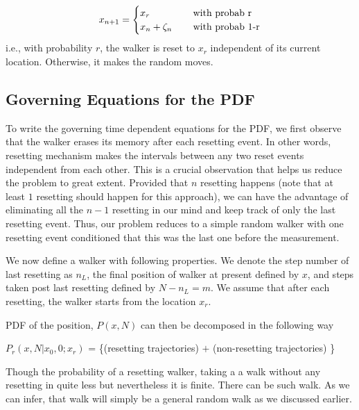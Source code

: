 \documentclass[showpacs,amsmath,amssymb,aps,pre,twocolumn]{revtex4-1}
\begin{document}
\begin{align}
x_{n+1} =\begin{cases}
          x_r \quad & \,  \textnormal{with probab r} \\
          x_n + \zeta _n \quad & \,  \textnormal{with probab 1-r}
     \end{cases}
\end{align}
i.e., with probability $r$, the walker is reset to $x_r$ independent of its current location. Otherwise, it makes the random moves.
\subsection{Governing Equations for the PDF}
To write the governing time dependent equations for the PDF, we first observe that the walker erases its memory after each resetting event. In other words, resetting mechanism makes the intervals between any two reset events independent from each other. This is a crucial observation that helps us reduce the problem to great extent. Provided that $n$ resetting happens (note that at least $1$ resetting should happen for this approach), we can have the advantage of eliminating all the $n-1$ resetting in our mind and keep track of only the last resetting event. Thus, our problem reduces to a simple random walker with one resetting event conditioned that this was the last one before the measurement. %


We now define a walker with following properties. We denote the step number of last resetting as $n_L$, the final position of walker at present defined by $x$, and
    steps taken post last resetting defined by $N-n_L = m$. We assume that after each resetting, the walker starts from the location
 $x_r$.


PDF of the position, $P(x,N)$ can then be decomposed in the following way
\begin{center}
    $P_r(x,N|x_0,0;x_r)$ = \bigg \{(resetting trajectories) $+$ (non-resetting trajectories)   \bigg \}
\end{center}

Though the probability of a resetting walker, taking a a walk without any resetting in quite less but nevertheless it is finite. There can be such walk. As we can infer, that walk will simply be a general random walk as we discussed earlier. \\
\end{document}

